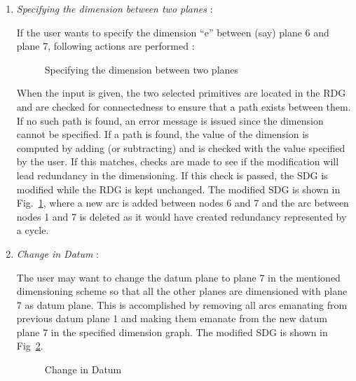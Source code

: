 		\begin{enumerate}
		\item
					{\em Specifying the dimension between two planes} :

                    If the user wants to specify the dimension ``e'' between 
                    (say) plane 6 and plane 7, following actions are performed :

        \begin{figure}[htbp]
            \caption{Specifying the dimension between two planes}
            \label{ex1dim2}
        \end{figure}


                    When the input is given, the two selected primitives are
                    located in the RDG and are checked for connectedness to
                    ensure that a path exists between them. If no such path is
                    found, an error message is issued since the dimension
                    cannot be specified. If a path is found, the value of the
                    dimension is computed by adding (or subtracting)
                    and is checked with the value specified by the
                    user. If this matches, checks are made to see if the
                    modification will lead redundancy in the 
                    dimensioning. If this check is passed,
                    the SDG is modified while the RDG is kept unchanged.
					The modified SDG is shown in Fig.~\ref{ex1dim2}, where
					a new arc is added between nodes 6 and 7 and the arc
					between nodes 1 and 7 is deleted as it would have created
					redundancy represented by a cycle.

		\item

    				{\em Change in Datum} :

    				The user may want to change the datum plane to plane 7
    				in the mentioned dimensioning scheme so that all the other
					planes are dimensioned with plane 7 as datum plane. 
					This is accomplished 
					by removing all arcs emanating from previous datum plane 1
					and making them emanate from the new datum plane 7 in
					the specified dimension graph.
					The modified SDG is shown in Fig~\ref{ex1dim3}.

        \begin{figure}[htbp]
            \caption{Change in Datum}
            \label{ex1dim3}
        \end{figure}


\end{enumerate}
